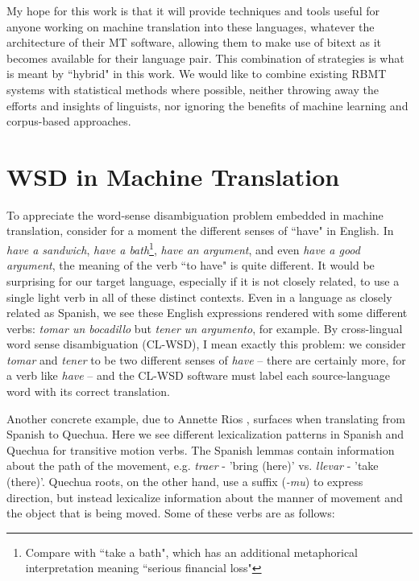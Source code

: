 My hope for this work is that it will provide techniques and tools useful for
anyone working on machine translation into these languages, whatever the
architecture of their MT software, allowing them to make use of bitext as it
becomes available for their language pair. This combination of strategies is
what is meant by ``hybrid" in this work. We would like to combine existing
RBMT systems with statistical methods where possible, neither throwing away the
efforts and insights of linguists, nor ignoring the benefits of machine
learning and corpus-based approaches.

\section{WSD in Machine Translation}
To appreciate the word-sense disambiguation problem embedded in machine
translation, consider for a moment the different senses of ``have" in
English. In \emph{have a sandwich}, \emph{have a bath}\footnote{Compare with
``take a bath", which has an additional metaphorical interpretation meaning
``serious financial loss"}, \emph{have an
argument}, and even \emph{have a good argument}, the meaning of the verb ``to
have" is quite different. It would be surprising for our target language,
especially if it is not closely related, to use a single light verb in
all of these distinct contexts. Even in a language as closely related as
Spanish, we see these English expressions rendered with some different
verbs: \emph{tomar un bocadillo} but \emph{tener un argumento}, for example.
By cross-lingual word sense disambiguation (CL-WSD), I mean exactly this
problem: we consider \emph{tomar} and \emph{tener} to be two different
senses of \emph{have} -- there are certainly more, for a verb like \emph{have}
-- and the CL-WSD software must label each source-language word with its
correct translation.

Another concrete example, due to Annette Rios \cite{rudnick:saltmil2014},
surfaces when translating from Spanish to Quechua. 
Here we see different lexicalization patterns in Spanish and Quechua
for transitive motion verbs. The Spanish lemmas contain information about the
path of the movement, e.g. {\em traer} - 'bring (here)' vs. {\em llevar} -
'take (there)'. Quechua roots, on the other hand, use a suffix ({\em -mu}) to
express direction, but instead lexicalize information about the manner of
movement and the object that is being moved. Some of these verbs are as
follows:


